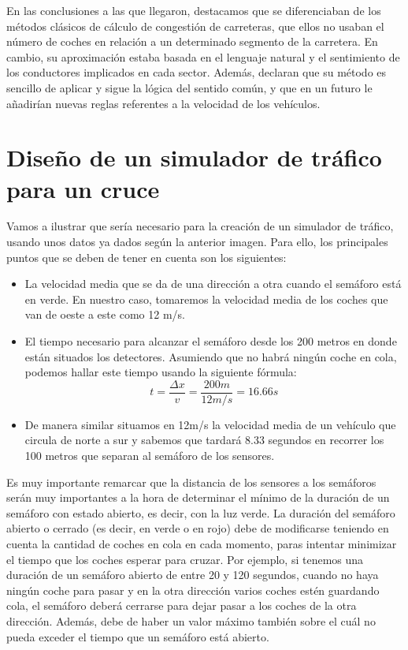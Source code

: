 En las conclusiones a las que llegaron, destacamos que se diferenciaban de los métodos clásicos de cálculo de congestión de carreteras, que ellos no usaban el número de coches en relación a un determinado segmento de la carretera. En cambio, su aproximación estaba basada en el lenguaje natural y el sentimiento de los conductores implicados en cada sector. Además, declaran que su método es sencillo de aplicar y sigue la lógica del sentido común, y que en un futuro le añadirían nuevas reglas referentes a la velocidad de los vehículos.

\section{Diseño de un simulador de tráfico para un cruce}
Vamos a ilustrar que sería necesario para la creación de un simulador de tráfico, usando unos datos ya dados según la anterior imagen. Para ello, los principales puntos que se deben de tener en cuenta son los siguientes:
\begin{itemize}
	\item La velocidad media que se da de una dirección a otra cuando el semáforo está en verde. En nuestro caso, tomaremos la velocidad media de los coches que van de oeste a este como 12 m/s.
	\item El tiempo necesario para alcanzar el semáforo desde los 200 metros en donde están situados los detectores. Asumiendo que no habrá ningún coche en cola, podemos hallar este tiempo usando la siguiente fórmula:
	$$ t = \frac{\Delta x}{v} = \frac{200m}{12m/s} = 16.66 s$$
	\item De manera similar situamos en 12m/s la velocidad media de un vehículo que circula de norte a sur y sabemos que tardará 8.33 segundos en recorrer los 100 metros que separan al semáforo de los sensores.
\end{itemize}

Es muy importante remarcar que la distancia de los sensores a los semáforos serán muy importantes a la hora de determinar el mínimo de la duración de un semáforo con estado abierto, es decir, con la luz verde. La duración del semáforo abierto o cerrado (es decir, en verde o en rojo) debe de modificarse teniendo en cuenta la cantidad de coches en cola en cada momento, paras intentar minimizar el tiempo que los coches esperar para cruzar. Por ejemplo, si tenemos una duración de un semáforo abierto de entre 20 y 120 segundos, cuando no haya ningún coche para pasar y en la otra dirección varios coches estén guardando cola, el semáforo deberá cerrarse para dejar pasar a los coches de la otra dirección. Además, debe de haber un valor máximo también sobre el cuál no pueda exceder el tiempo que un semáforo está abierto.\\

